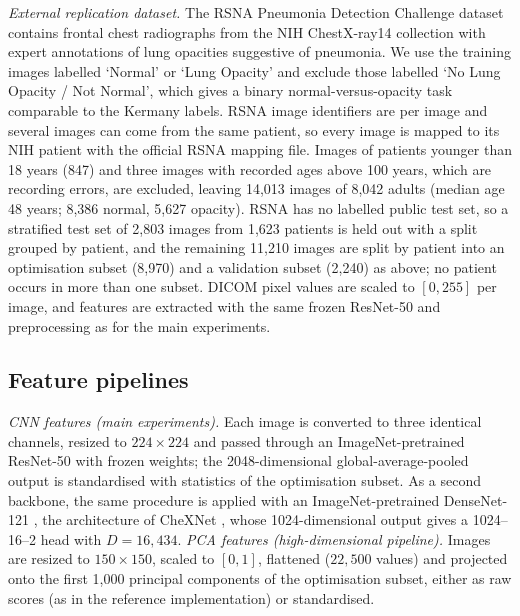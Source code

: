 \documentclass[preprint,12pt]{elsarticle}
\begin{document}
\emph{External replication dataset.} The RSNA Pneumonia Detection Challenge dataset \citep{shih2019rsna} contains frontal chest radiographs from the NIH ChestX-ray14 collection with expert annotations of lung opacities suggestive of pneumonia. We use the training images labelled `Normal' or `Lung Opacity' and exclude those labelled `No Lung Opacity / Not Normal', which gives a binary normal-versus-opacity task comparable to the Kermany labels. RSNA image identifiers are per image and several images can come from the same patient, so every image is mapped to its NIH patient with the official RSNA mapping file. Images of patients younger than 18 years (847) and three images with recorded ages above 100 years, which are recording errors, are excluded, leaving 14,013 images of 8,042 adults (median age 48 years; 8,386 normal, 5,627 opacity). RSNA has no labelled public test set, so a stratified test set of 2,803 images from 1,623 patients is held out with a split grouped by patient, and the remaining 11,210 images are split by patient into an optimisation subset (8,970) and a validation subset (2,240) as above; no patient occurs in more than one subset. DICOM pixel values are scaled to $[0,255]$ per image, and features are extracted with the same frozen ResNet-50 and preprocessing as for the main experiments.

\subsection{Feature pipelines}
\emph{CNN features (main experiments).} Each image is converted to three identical channels, resized to $224\times224$ and passed through an ImageNet-pretrained ResNet-50 \citep{he2016resnet,deng2009imagenet} with frozen weights; the 2048-dimensional global-average-pooled output is standardised with statistics of the optimisation subset. As a second backbone, the same procedure is applied with an ImageNet-pretrained DenseNet-121 \citep{huang2017densenet}, the architecture of CheXNet \citep{rajpurkar2017chexnet}, whose 1024-dimensional output gives a 1024--16--2 head with $D=16{,}434$.
\emph{PCA features (high-dimensional pipeline).} Images are resized to $150\times150$, scaled to $[0,1]$, flattened ($22{,}500$ values) and projected onto the first 1,000 principal components of the optimisation subset, either as raw scores (as in the reference implementation) or standardised.
\end{document}
